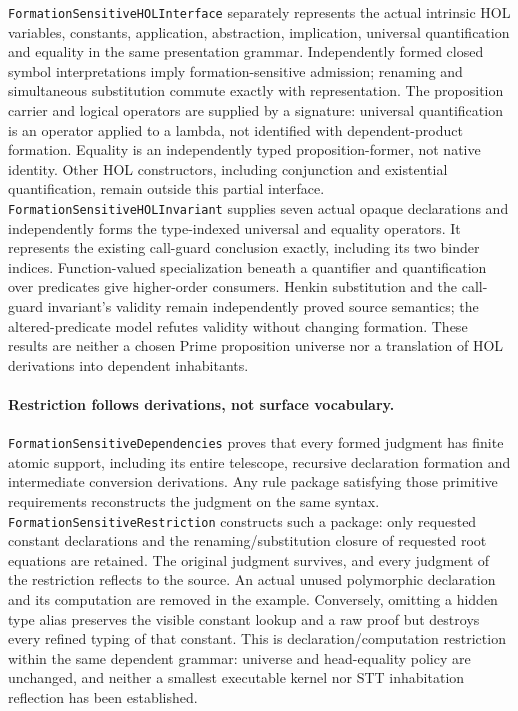 \documentclass[11pt]{article}
\theoremstyle{definition}
\theoremstyle{remark}
\begin{document}
\nolinkurl{FormationSensitiveHOLInterface} separately represents the actual
intrinsic HOL variables, constants, application, abstraction, implication,
universal quantification and equality in the same presentation grammar. Independently
formed closed symbol interpretations imply formation-sensitive admission;
renaming and simultaneous substitution commute exactly with representation.
The proposition carrier and logical operators are supplied by a signature:
universal quantification is an operator applied to a lambda, not identified
with dependent-product formation. Equality is an independently typed
proposition-former, not native identity. Other HOL constructors, including
conjunction and existential quantification, remain outside this partial interface.
\nolinkurl{FormationSensitiveHOLInvariant} supplies seven actual opaque
declarations and independently forms the type-indexed universal and equality operators.
It represents the existing call-guard conclusion exactly, including its two
binder indices. Function-valued specialization beneath a quantifier and
quantification over predicates give higher-order consumers. Henkin substitution
and the call-guard invariant's validity remain independently proved source
semantics; the altered-predicate model refutes validity without changing
formation. These results are neither a chosen Prime proposition universe nor
a translation of HOL derivations into dependent inhabitants.

\paragraph{Restriction follows derivations, not surface vocabulary.}
\nolinkurl{FormationSensitiveDependencies} proves that every formed judgment
has finite atomic support, including its entire telescope, recursive
declaration formation and intermediate conversion derivations. Any rule
package satisfying those primitive requirements reconstructs the judgment
on the same syntax. \nolinkurl{FormationSensitiveRestriction} constructs
such a package: only requested constant declarations and the
renaming/substitution closure of requested root equations are retained.
The original judgment survives, and every judgment of the restriction
reflects to the source. An actual unused polymorphic declaration and its
computation are removed in the example. Conversely, omitting a hidden type
alias preserves the visible constant lookup and a raw proof but destroys
every refined typing of that constant. This is declaration/computation
restriction within the same dependent grammar: universe and head-equality
policy are unchanged, and neither a smallest executable kernel nor STT
inhabitation reflection has been established.
\end{document}
